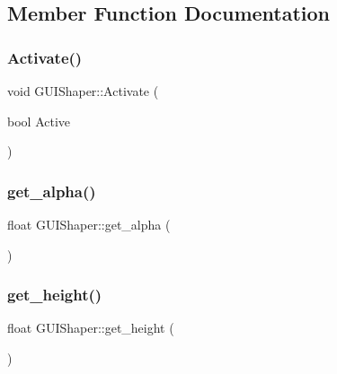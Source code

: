 \subsection{Member Function Documentation}
\hypertarget{class_g_u_i_shaper_a0cb0dc27480f4690e07ddb93ae21fa8a}{}\label{class_g_u_i_shaper_a0cb0dc27480f4690e07ddb93ae21fa8a} 
\subsubsection{\texorpdfstring{Activate()}{Activate()}}
{\footnotesize\ttfamily void G\+U\+I\+Shaper\+::\+Activate (\begin{DoxyParamCaption}\item[{bool}]{Active }\end{DoxyParamCaption})}

\hypertarget{class_g_u_i_shaper_a4f41756ceadc5f46ed5b5eb997762735}{}\label{class_g_u_i_shaper_a4f41756ceadc5f46ed5b5eb997762735} 
\subsubsection{\texorpdfstring{get\+\_\+alpha()}{get\_alpha()}}
{\footnotesize\ttfamily float G\+U\+I\+Shaper\+::get\+\_\+alpha (\begin{DoxyParamCaption}{ }\end{DoxyParamCaption})}

\hypertarget{class_g_u_i_shaper_a5477316de8fe3c5838d1633395cc1fd9}{}\label{class_g_u_i_shaper_a5477316de8fe3c5838d1633395cc1fd9} 
\subsubsection{\texorpdfstring{get\+\_\+height()}{get\_height()}}
{\footnotesize\ttfamily float G\+U\+I\+Shaper\+::get\+\_\+height (\begin{DoxyParamCaption}{ }\end{DoxyParamCaption})}

\hypertarget{class_g_u_i_shaper_ad16d82813eca50ed60a5731c2b05e37e}{}\label{class_g_u_i_shaper_ad16d82813eca50ed60a5731c2b05e37e} 
